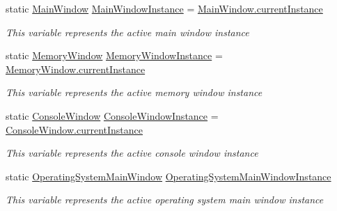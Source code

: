 \begin{DoxyCompactItemize}
\item 
static \hyperlink{class_c_p_u___o_s___simulator_1_1_main_window}{Main\+Window} \hyperlink{class_c_p_u___o_s___simulator_1_1_window_bridge_1_1_window_instances_a130a2c32e8ccfd51a42ecb363fbb42cc}{Main\+Window\+Instance} = \hyperlink{class_c_p_u___o_s___simulator_1_1_main_window_a1280266cc57403a91f08a8350dee05cc}{Main\+Window.\+current\+Instance}
\begin{DoxyCompactList}\small\item\em This variable represents the active main window instance \end{DoxyCompactList}\item 
static \hyperlink{class_c_p_u___o_s___simulator_1_1_memory_window}{Memory\+Window} \hyperlink{class_c_p_u___o_s___simulator_1_1_window_bridge_1_1_window_instances_a401fd485bde830472a1a960a25ec1464}{Memory\+Window\+Instance} = \hyperlink{class_c_p_u___o_s___simulator_1_1_memory_window_a870b795e3b919a82888ad608ab24d61a}{Memory\+Window.\+current\+Instance}
\begin{DoxyCompactList}\small\item\em This variable represents the active memory window instance \end{DoxyCompactList}\item 
static \hyperlink{class_c_p_u___o_s___simulator_1_1_console_window}{Console\+Window} \hyperlink{class_c_p_u___o_s___simulator_1_1_window_bridge_1_1_window_instances_a90b746b2373f150cab75e4dee0f91c45}{Console\+Window\+Instance} = \hyperlink{class_c_p_u___o_s___simulator_1_1_console_window_abee2fd1e118dd4f81dc2142bc033da4a}{Console\+Window.\+current\+Instance}
\begin{DoxyCompactList}\small\item\em This variable represents the active console window instance \end{DoxyCompactList}\item 
static \hyperlink{class_c_p_u___o_s___simulator_1_1_operating_system_main_window}{Operating\+System\+Main\+Window} \hyperlink{class_c_p_u___o_s___simulator_1_1_window_bridge_1_1_window_instances_a151a9fa30e40800129d05845501f7b64}{Operating\+System\+Main\+Window\+Instance}
\begin{DoxyCompactList}\small\item\em This variable represents the active operating system main window instance \end{DoxyCompactList}\item 

\end{DoxyCompactItemize}
